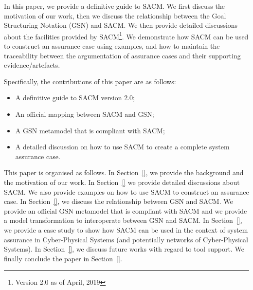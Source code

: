 

In this paper, we provide a definitive guide to SACM. We first discuss the motivation of our work, then we discuss the relationship between the Goal Structuring Notation (GSN) and SACM. We then provide detailed discussions about the facilities provided by SACM\footnote{Version 2.0 as of April, 2019}. We demonstrate how SACM can be used to construct an assurance case using examples, and how to maintain the traceability between the argumentation of assurance cases and their supporting evidence/artefacts.

Specifically, the contributions of this paper are as follows:
\begin{itemize}
	\item A definitive guide to SACM version 2.0;
	\item An official mapping between SACM and GSN;
	\item A GSN metamodel that is compliant with SACM;
	\item A detailed discussion on how to use SACM to create a complete system assurance case.
\end{itemize}

This paper is organised as follows. In Section~\ref{}, we provide the background and the motivation of our work. In Section~\ref{} we provide detailed discussions about SACM. We also provide examples on how to use SACM to construct an assurance case. In Section~\ref{}, we discuss the relationship between GSN and SACM. We provide an official GSN metamodel that is compliant with SACM and we provide a model transformation to interoperate between GSN and SACM. In Section~\ref{}, we provide a case study to show how SACM can be used in the context of system assurance in Cyber-Physical Systems (and potentially networks of Cyber-Physical Systems). In Section~\ref{}, we discuss future works with regard to tool support. We finally conclude the paper in Section~\ref{}.

